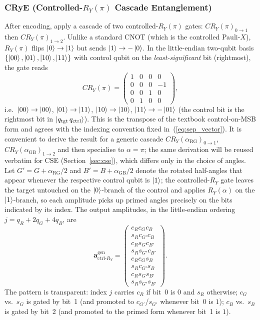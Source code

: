 \documentclass[conference,compsoc]{IEEEtran}
\begin{document}
\subsubsection{CRyE (Controlled-$R_Y(\pi)$ Cascade Entanglement)}
\label{sec:crye}
After encoding, apply a cascade of two controlled-$R_Y(\pi)$ gates: $CR_Y(\pi)_{0 \to 1}$ then $CR_Y(\pi)_{1 \to 2}$.
Unlike a standard CNOT (which is the controlled Pauli-$X$), $R_Y(\pi)$ flips $\ket{0}\to\ket{1}$ but sends $\ket{1}\to -\ket{0}$.
In the little-endian two-qubit basis $\{\ket{00},\ket{01},\ket{10},\ket{11}\}$ with control qubit on the \emph{least-significant} bit (rightmost), the gate reads
\begin{equation}
    CR_Y(\pi) = \begin{pmatrix} 1 & 0 & 0 & 0 \\ 0 & 0 & 0 & -1 \\ 0 & 0 & 1 & 0 \\ 0 & 1 & 0 & 0 \end{pmatrix},
\end{equation}
i.e.\ $\ket{00}\to\ket{00}$, $\ket{01}\to\ket{11}$, $\ket{10}\to\ket{10}$, $\ket{11}\to -\ket{01}$ (the control bit is the rightmost bit in $\ket{q_\text{tgt}\,q_\text{ctrl}}$).
This is the transpose of the textbook control-on-MSB form and agrees with the indexing convention fixed in~(\ref{eq:sep_vector}).
It is convenient to derive the result for a generic cascade $CR_Y(\alpha_\text{RG})_{0\to 1}$, $CR_Y(\alpha_\text{GB})_{1\to 2}$ and then specialise to $\alpha=\pi$; the same derivation will be reused verbatim for CSE (Section~\ref{sec:cse}), which differs only in the choice of angles.
Let $G' = G + \alpha_\text{RG}/2$ and $B' = B + \alpha_\text{GB}/2$ denote the rotated half-angles that appear whenever the respective control qubit is $\ket{1}$; the controlled-$R_Y$ gate leaves the target untouched on the $\ket{0}$-branch of the control and applies $R_Y(\alpha)$ on the $\ket{1}$-branch, so each amplitude picks up primed angles precisely on the bits indicated by its index.
The output amplitudes, in the little-endian ordering $j = q_R + 2 q_G + 4 q_B$, are
\begin{equation}
    \mathbf{a}^\text{gen}_\text{ctrl-$R_Y$} = \begin{pmatrix} c_R c_G c_B \\ s_R c_{G'} c_B \\ c_R s_G c_{B'} \\ s_R s_{G'} c_{B'} \\ c_R c_G s_B \\ s_R c_{G'} s_B \\ c_R s_G s_{B'} \\ s_R s_{G'} s_{B'} \end{pmatrix}.
    \label{eq:amps_ctrl_ry_generic}
\end{equation}
The pattern is transparent: index $j$ carries $c_R$ if bit~0 is $0$ and $s_R$ otherwise; $c_G$ vs.\ $s_G$ is gated by bit~1 (and promoted to $c_{G'}$/$s_{G'}$ whenever bit~0 is $1$); $c_B$ vs.\ $s_B$ is gated by bit~2 (and promoted to the primed form whenever bit~1 is $1$).
\end{document}
